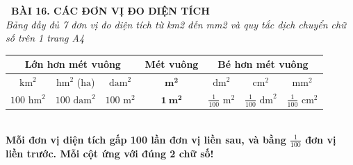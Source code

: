 \documentclass[14pt,a4paper,oneside]{extbook}
\begin{document}
\noindent
\begin{tcolorbox}[
  enhanced,
  colback=teal!8!white,
  colframe=teal!80!black,
  arc=3mm,
  boxrule=1.1pt,
  width=\linewidth,
  halign=center,
  top=2.2mm, bottom=2.2mm,
  left=3mm, right=3mm,
  drop fuzzy shadow
]
  {\large\bfseries\color{teal!95!black}\faBookmark\ BÀI 16. CÁC ĐƠN VỊ ĐO DIỆN TÍCH}\\[2pt]
  {\scriptsize\color{black!75}\itshape Bảng đầy đủ 7 đơn vị đo diện tích từ km2 đến mm2 và quy tắc dịch chuyển chữ số trên 1 trang A4}
\end{tcolorbox}

\vspace{3.2mm}
\noindent
\begin{tcolorbox}[
  enhanced,
  title={\footnotesize\bfseries\color{white}\faTable\ 1. Bảng đầy đủ các đơn vị đo diện tích},
  colback=blue!2!white,
  colframe=blue!75!black,
  arc=2.5mm, boxrule=0.8pt, top=1.8mm, bottom=1.8mm, left=2mm, right=2mm
]
  \scriptsize
  \centering
  \begin{tabular}{|c|c|c|c|c|c|c|}
    \hline
    \multicolumn{3}{|c|}{\textbf{Lớn hơn mét vuông}} & \textbf{Mét vuông} & \multicolumn{3}{c|}{\textbf{Bé hơn mét vuông}} \\ \hline
    $\text{km}^2$ & $\text{hm}^2$ ($\text{ha}$) & $\text{dam}^2$ & $\mathbf{m^2}$ & $\text{dm}^2$ & $\text{cm}^2$ & $\text{mm}^2$ \\ \hline
    $100\text{ hm}^2$ & $100\text{ dam}^2$ & $100\text{ m}^2$ & $\mathbf{1\ m^2}$ & $\frac{1}{100}\text{ m}^2$ & $\frac{1}{100}\text{ dm}^2$ & $\frac{1}{100}\text{ cm}^2$ \\ \hline
  \end{tabular}\\[3pt]
  {\tiny\color{blue!85!black}\bfseries Mỗi đơn vị diện tích gấp 100 lần đơn vị liền sau, và bằng $\frac{1}{100}$ đơn vị liền trước. Mỗi cột ứng với đúng 2 chữ số!}
\end{tcolorbox}

\vspace{3mm}
\end{document}
